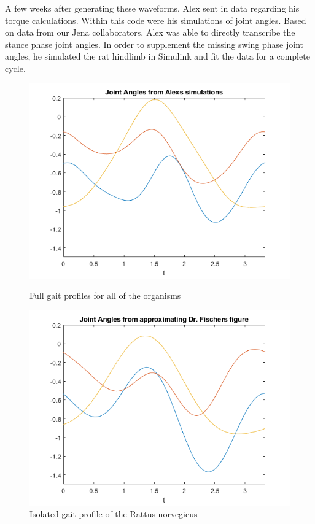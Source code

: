 \documentclass[runningheads,a4paper]{llncs}
\begin{document}
	A few weeks after generating these waveforms, Alex sent in data regarding his torque calculations. Within this code were his simulations of joint angles. Based on data from our Jena collaborators, Alex was able to directly transcribe the stance phase joint angles. In order to supplement the missing swing phase joint angles, he simulated the rat hindlimb in Simulink and fit the data for a complete cycle. \par
			\begin{figure}
				\centering
				\begin{minipage}{0.5\textwidth}
					\centering
					\includegraphics[width=\textwidth]{jointangles3.png}
					\caption{Full gait profiles for all of the organisms}
				\end{minipage}\hfill
				\begin{minipage}{0.5\textwidth}
					\centering
					\includegraphics[width=\textwidth]{jointangles4.png}
					\caption{Isolated gait profile of the Rattus norvegicus}
				\end{minipage}
			\end{figure}
\end{document}

